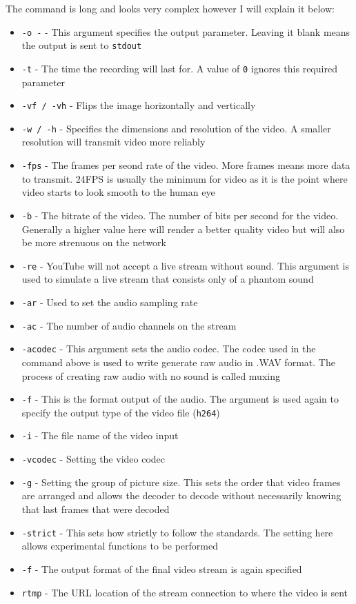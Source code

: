 \documentclass[10pt,a4paper]{article}
\begin{document}
The command is long and looks very complex however I will explain it below:
\begin{itemize}
    \item \texttt{-o -} - This argument specifies the output parameter. Leaving it blank means the output is sent to \texttt{stdout}
    \item \texttt{-t} - The time the recording will last for. A value of \texttt{0} ignores this required parameter
    \item \texttt{-vf / -vh} - Flips the image horizontally and vertically
    \item \texttt{-w / -h} - Specifies the dimensions and resolution of the video. A smaller resolution will transmit video more reliably 
    \item \texttt{-fps} - The frames per seond rate of the video. More frames means more data to transmit. 24FPS is usually the minimum for video as it is the point where video starts to look smooth to the human eye
    \item \texttt{-b} - The bitrate of the video. The number of bits per second for the video. Generally a higher value here will render a better quality video but will also be more strenuous on the network
    \item \texttt{-re} - YouTube will not accept a live stream without sound. This argument is used to simulate a live stream that consists only of a phantom sound
    \item \texttt{-ar} - Used to set the audio sampling rate
    \item \texttt{-ac} - The number of audio channels on the stream
    \item \texttt{-acodec} - This argument sets the audio codec. The codec used in the command above is used to write generate raw audio in .WAV format. The process of creating raw audio with no sound is called muxing
    \item \texttt{-f} - This is the format output of the audio. The argument is used again to specify the output type of the video file (\texttt{h264})
    \item \texttt{-i} - The file name of the video input
    \item \texttt{-vcodec} - Setting the video codec
    \item \texttt{-g} - Setting the group of picture size. This sets the order that video frames are arranged and allows the decoder to decode without necessarily knowing that last frames that were decoded
    \item \texttt{-strict} - This sets how strictly to follow the standards. The setting here allows experimental functions to be performed
    \item \texttt{-f} - The output format of the final video stream is again specified
    \item \texttt{rtmp} - The URL location of the stream connection to where the video is sent 
\end{itemize}
\end{document}
